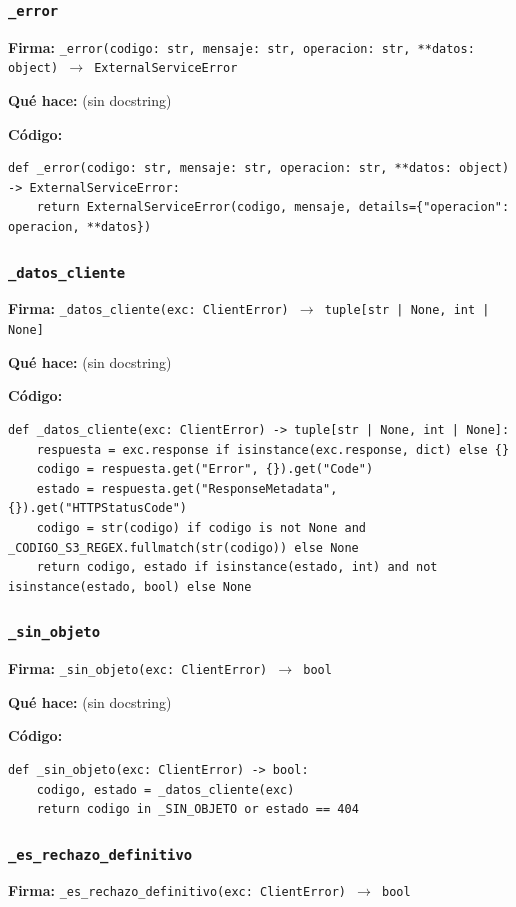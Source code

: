 \documentclass[11pt,a4paper]{article}
\begin{document}
\subsubsection*{\texttt{\_error}}
\textbf{Firma:} \texttt{\_error(codigo: str, mensaje: str, operacion: str, **datos: object) $\rightarrow$ ExternalServiceError}

\textbf{Qué hace:} (sin docstring)

\textbf{Código:}
\begin{lstlisting}
def _error(codigo: str, mensaje: str, operacion: str, **datos: object) -> ExternalServiceError:
    return ExternalServiceError(codigo, mensaje, details={"operacion": operacion, **datos})
\end{lstlisting}

\subsubsection*{\texttt{\_datos\_cliente}}
\textbf{Firma:} \texttt{\_datos\_cliente(exc: ClientError) $\rightarrow$ tuple[str | None, int | None]}

\textbf{Qué hace:} (sin docstring)

\textbf{Código:}
\begin{lstlisting}
def _datos_cliente(exc: ClientError) -> tuple[str | None, int | None]:
    respuesta = exc.response if isinstance(exc.response, dict) else {}
    codigo = respuesta.get("Error", {}).get("Code")
    estado = respuesta.get("ResponseMetadata", {}).get("HTTPStatusCode")
    codigo = str(codigo) if codigo is not None and _CODIGO_S3_REGEX.fullmatch(str(codigo)) else None
    return codigo, estado if isinstance(estado, int) and not isinstance(estado, bool) else None
\end{lstlisting}

\subsubsection*{\texttt{\_sin\_objeto}}
\textbf{Firma:} \texttt{\_sin\_objeto(exc: ClientError) $\rightarrow$ bool}

\textbf{Qué hace:} (sin docstring)

\textbf{Código:}
\begin{lstlisting}
def _sin_objeto(exc: ClientError) -> bool:
    codigo, estado = _datos_cliente(exc)
    return codigo in _SIN_OBJETO or estado == 404
\end{lstlisting}

\subsubsection*{\texttt{\_es\_rechazo\_definitivo}}
\textbf{Firma:} \texttt{\_es\_rechazo\_definitivo(exc: ClientError) $\rightarrow$ bool}
\end{document}
